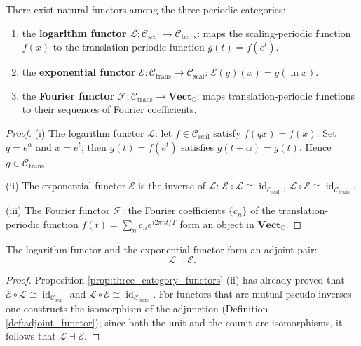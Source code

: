 \begin{proposition}\label{prop:three_category_functors}
There exist natural functors among the three periodic categories:
\begin{enumerate}[label=(\roman*)]
    \item the \textbf{logarithm functor} $\mathcal{L}: \mathcal{C}_{\text{scal}} \to \mathcal{C}_{\text{trans}}$: maps the scaling-periodic function $f(x)$ to the translation-periodic function $g(t) = f(e^t)$.
    \item the \textbf{exponential functor} $\mathcal{E}: \mathcal{C}_{\text{trans}} \to \mathcal{C}_{\text{scal}}$: $\mathcal{E}(g)(x) = g(\ln x)$.
    \item the \textbf{Fourier functor} $\mathcal{F}: \mathcal{C}_{\text{trans}} \to \mathbf{Vect}_{\mathbb{C}}$: maps translation-periodic functions to their sequences of Fourier coefficients.
\end{enumerate}
\end{proposition}

\begin{proof}
(i) The logarithm functor $\mathcal{L}$: let $f \in \mathcal{C}_{\text{scal}}$ satisfy $f(qx) = f(x)$. Set $q = e^{\alpha}$ and $x = e^t$; then $g(t) = f(e^t)$ satisfies $g(t+\alpha) = g(t)$. Hence $g \in \mathcal{C}_{\text{trans}}$.

(ii) The exponential functor $\mathcal{E}$ is the inverse of $\mathcal{L}$: $\mathcal{E} \circ \mathcal{L} \cong \operatorname{id}_{\mathcal{C}_{\text{scal}}}$, $\mathcal{L} \circ \mathcal{E} \cong \operatorname{id}_{\mathcal{C}_{\text{trans}}}$.

(iii) The Fourier functor $\mathcal{F}$: the Fourier coefficients $\{c_n\}$ of the translation-periodic function $f(t) = \sum_n c_n e^{i 2\pi n t / T}$ form an object in $\mathbf{Vect}_{\mathbb{C}}$.
\end{proof}

\begin{corollary}\label{cor:grammar_adjunction}
The logarithm functor and the exponential functor form an adjoint pair:
\[
\mathcal{L} \dashv \mathcal{E}.
\]
\end{corollary}

\begin{proof}
Proposition \ref{prop:three_category_functors} (ii) has already proved that $\mathcal{E}\circ\mathcal{L} \cong \operatorname{id}_{\mathcal{C}_{\text{scal}}}$ and $\mathcal{L}\circ\mathcal{E} \cong \operatorname{id}_{\mathcal{C}_{\text{trans}}}$. For functors that are mutual pseudo-inverses one constructs the isomorphism of the adjunction (Definition \ref{def:adjoint_functor}); since both the unit and the counit are isomorphisms, it follows that $\mathcal{L} \dashv \mathcal{E}$.
\end{proof}


